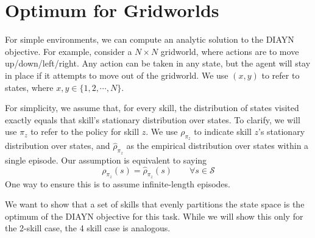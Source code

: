 \documentclass{article} %
\theoremstyle{questionstyle}\newtheorem{question}{Question}
\begin{document}
\section{Optimum for Gridworlds}
\label{appendix:proof}
For simple environments, we can compute an analytic solution to the DIAYN objective. For example, consider a $N \times N$ gridworld, where actions are to move up/down/left/right. Any action can be taken in any state, but the agent will stay in place if it attempts to move out of the gridworld. We use $(x, y)$ to refer to states, where $x, y \in \{1, 2, \cdots, N\}$.

For simplicity, we assume that, for every skill, the distribution of states visited exactly equals that skill's stationary distribution over states. To clarify, we will use $\pi_z$ to refer to the policy for skill $z$. We use $\rho_{\pi_z}$ to indicate skill $z$'s stationary distribution over states, and $\hat{\rho}_{\pi_z}$ as the empirical distribution over states within a single episode. Our assumption is equivalent to saying
\begin{equation*}
\rho_{\pi_z}(s) = \hat{\rho}_{\pi_z}(s) \qquad \forall s \in \mathcal{S}
\end{equation*}
One way to ensure this is to assume infinite-length episodes.

We want to show that a set of skills that evenly partitions the state space is the optimum of the DIAYN objective for this task. While we will show this only for the 2-skill case, the 4 skill case is analogous.
\end{document}
